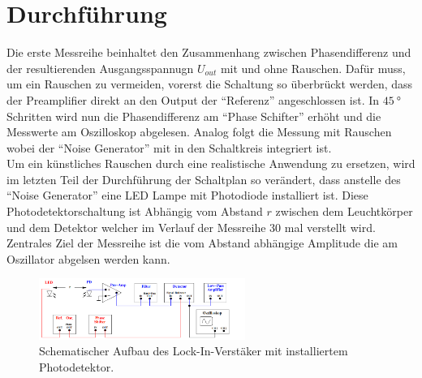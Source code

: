 \section{Durchführung}
Die erste Messreihe beinhaltet den Zusammenhang zwischen Phasendifferenz und der resultierenden Ausgangsspannugn $U_{out}$ mit und ohne Rauschen.
Dafür muss, um ein Rauschen zu vermeiden, vorerst die Schaltung so überbrückt werden, dass der Preamplifier direkt an den Output der 
\enquote{Referenz} angeschlossen ist. In $\SI{45}{\degree}$ Schritten wird nun die Phasendifferenz am \enquote{Phase Schifter} erhöht und die Messwerte am 
Oszilloskop abgelesen. Analog folgt die Messung mit Rauschen wobei der \enquote{Noise Generator} mit in den Schaltkreis integriert ist.
\\
\newline
Um ein künstliches Rauschen durch eine realistische Anwendung zu ersetzen, wird im letzten Teil der Durchführung der Schaltplan so verändert,
dass anstelle des \enquote{Noise Generator} eine LED Lampe mit Photodiode installiert ist. Diese Photodetektorschaltung ist Abhängig vom Abstand $r$ zwischen dem Leuchtkörper und dem Detektor
welcher im Verlauf der Messreihe 30 mal verstellt wird. Zentrales Ziel der Messreihe ist die vom Abstand abhängige Amplitude die am Oszillator abgelsen werden kann.
\begin{figure}
    \centering
    \includegraphics[width=0.6\textwidth]{bilder/licht.png}
    \caption{Schematischer Aufbau des Lock-In-Verstäker mit installiertem Photodetektor. \cite{skript}} 
    \label{fig:licht}
\end{figure}